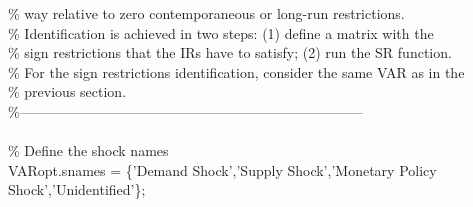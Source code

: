 \hspace{1mm}\hspace{5mm} \hspace{5mm} \textcolor{matlabgreen}{\% way relative to zero contemporaneous or long-run restrictions.  }\\ 
\hspace{1mm}\hspace{5mm} \hspace{5mm} \textcolor{matlabgreen}{\% Identification is achieved in two steps: (1) define a matrix with the }\\ 
\hspace{1mm}\hspace{5mm} \hspace{5mm} \textcolor{matlabgreen}{\% sign restrictions that the IRs have to satisfy; (2) run the SR function. }\\ 
\hspace{1mm}\hspace{5mm} \hspace{5mm} \textcolor{matlabgreen}{\% For the sign restrictions identification, consider the same VAR as in the  }\\ 
\hspace{1mm}\hspace{5mm} \hspace{5mm} \textcolor{matlabgreen}{\% previous section. }\\ 
\hspace{1mm}\hspace{5mm} \hspace{5mm} \textcolor{matlabgreen}{\%--------------------------------------------------------------------------  }\\ 
\hspace{1mm}\hspace{5mm} \hspace{5mm}  \\ 
\hspace{1mm}\hspace{5mm} \hspace{5mm} \textcolor{matlabgreen}{\% Define the shock names }\\ 
\hspace{1mm}\hspace{5mm} \hspace{5mm} VARopt.snames = \{\textcolor{matlabpurple}{'Demand Shock'},\textcolor{matlabpurple}{'Supply Shock'},\textcolor{matlabpurple}{'Monetary Policy Shock'},\textcolor{matlabpurple}{'Unidentified'}\}; \\ 
